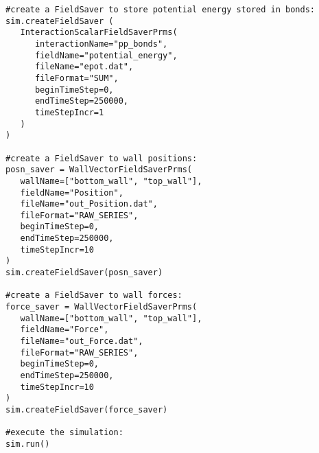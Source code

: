\begin{verbatim}
#create a FieldSaver to store potential energy stored in bonds:
sim.createFieldSaver (
   InteractionScalarFieldSaverPrms(
      interactionName="pp_bonds",
      fieldName="potential_energy",
      fileName="epot.dat",
      fileFormat="SUM",
      beginTimeStep=0,
      endTimeStep=250000,
      timeStepIncr=1
   )
)

#create a FieldSaver to wall positions:
posn_saver = WallVectorFieldSaverPrms(
   wallName=["bottom_wall", "top_wall"],
   fieldName="Position",
   fileName="out_Position.dat",
   fileFormat="RAW_SERIES",
   beginTimeStep=0,
   endTimeStep=250000,
   timeStepIncr=10
)
sim.createFieldSaver(posn_saver)

#create a FieldSaver to wall forces:
force_saver = WallVectorFieldSaverPrms(
   wallName=["bottom_wall", "top_wall"],
   fieldName="Force",
   fileName="out_Force.dat",
   fileFormat="RAW_SERIES",
   beginTimeStep=0,
   endTimeStep=250000,
   timeStepIncr=10
)
sim.createFieldSaver(force_saver)

#execute the simulation:
sim.run()
\end{verbatim}

